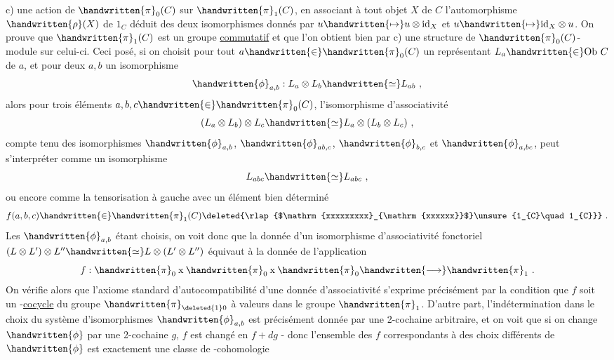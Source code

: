 c) une action de $\handwritten{\pi}_{0}(C)$ sur $\handwritten{\pi}_{1}(C)$, en associant à tout objet $X$ de $C$ l'automorphisme  $\handwritten{\rho}(X)$ de $1_C$ déduit des deux isomorphismes
donnés par $u\handwritten{\mapsto}u\otimes\mathrm{id}_{X}$ et $u\handwritten{\mapsto}\mathrm{id}_{X}\otimes u$. On prouve que $\handwritten{\pi}_{1}(C)$ est un groupe \uline{commutatif} et que l'on obtient bien par c) une structure de $\handwritten{\pi}_{0}(C)$-module sur celui-ci. Ceci posé, si on choisit pour tout $a\handwritten{\in}\handwritten{\pi}_{0}(C)$ un représentant $L_{a}\handwritten{\in}\mathrm{Ob}\ C$ de $a$, et pour deux  $a,b$ un isomorphisme
\[
\handwritten{\phi}_{a,b}: L_a\otimes L_b\handwritten{\simeq}L_{ab}\ , 
\]
alors pour trois éléments $a,b,c\handwritten{\in}\handwritten{\pi}_{0}(C)$, l'isomorphisme d'associativité
\[
(L_a\otimes L_b)\otimes L_c\handwritten{\simeq}L_a\otimes(L_b\otimes L_c)\ ,
\]
compte tenu des isomorphismes $\handwritten{\phi}_{a,b}$, $\handwritten{\phi}_{ab,c}$, $\handwritten{\phi}_{b,c}$ et $\handwritten{\phi}_{a,bc}$, peut s'interpréter comme un isomorphisme
\[
L_{abc}\handwritten{\simeq}L_{abc}\ ,
\]
ou encore comme la tensorisation à gauche avec un élément bien déterminé
\[
f(a,b,c)\handwritten{\in}\handwritten{\pi}_{1}(C)\deleted{\rlap{$\mathrm{xxxxxxxxx}_{\mathrm{xxxxxx}}$}\unsure{1_{C}\quad 1_{C}}}\ .
\]
Les $\handwritten{\phi}_{a,b}$ étant choisis, on voit donc que la donnée d'un isomorphisme d'associativité fonctoriel $(L\otimes L')\otimes L''\handwritten{\simeq}L\otimes(L'\otimes L'')$ équivaut à la donnée de l'application
\[
f:\handwritten{\pi}_{0}\mathbin{\mathrm{x}}\handwritten{\pi}_{0}\mathbin{\mathrm{x}}\handwritten{\pi}_{0}\handwritten{\longrightarrow}\handwritten{\pi}_{1}\ .
\]
On vérifie alors que l'axiome  standard d'autocompatibilité d'une donnée d'associativité  s'exprime précisément par la condition que $f$ soit un -\uline{cocycle} du groupe $\handwritten{\pi}_{\deleted{1}0}$ à valeurs dans le groupe $\handwritten{\pi}_{1}$. D'autre part, l'indétermination dans le choix du système d'isomorphismes $\handwritten{\phi}_{a,b}$ est précisément donnée par une 2-cochaine arbitraire, et on voit que si on change $\handwritten{\phi}$ par une 2-cochaine $g$, $f$ est changé en $f+dg$ - donc l'ensemble des $f$ correspondants à des choix différents de $\handwritten{\phi}$ est exactement une classe de -cohomologie
